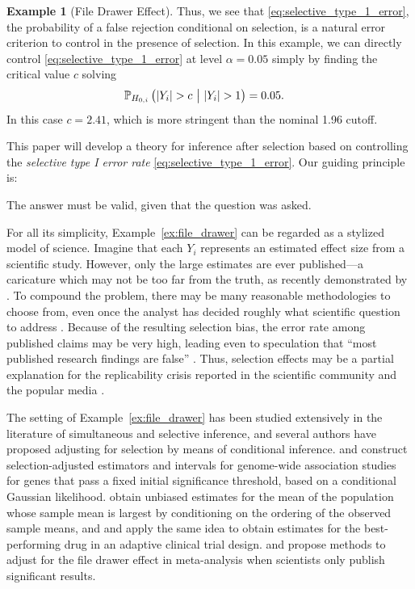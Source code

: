 \documentclass{article}
\theoremstyle{definition}
\newtheorem{example}{Example}
\begin{document}
\begin{example}[File Drawer Effect]
Thus, we see that \eqref{eq:selective_type_1_error}, the probability of a false rejection conditional on selection, is a natural error criterion to control in the presence of selection. In this example, we can directly control \eqref{eq:selective_type_1_error} at level $\alpha=0.05$ simply by finding the critical value $c$ solving
\begin{align*}
\P_{H_{0,i}}\left( |Y_i| > c\ \big|\ |Y_i| > 1 \right) &= 0.05.
\end{align*}
In this case $c = 2.41$, which is more stringent than the nominal 1.96 cutoff.
\end{example}

This paper will develop a theory for inference after selection based on controlling the {\em selective type I error rate} \eqref{eq:selective_type_1_error}. Our guiding principle is:
\begin{center}
The answer must be valid, given that the question was asked.
\end{center}

For all its simplicity, Example~\ref{ex:file_drawer} can be regarded as a stylized model of science. Imagine that each $Y_i$ represents an estimated effect size from a scientific study. However, only the large estimates are ever published---a caricature which may not be too far from the truth, as recently demonstrated by \citet{franco14}. To compound the problem, there may be many reasonable methodologies to choose from, even once the analyst has decided roughly what scientific question to address \citep{gelman2013garden}. Because of the resulting selection bias, the error rate among published claims may be very high, leading even to speculation that ``most published research findings are false'' \citep{ioannidis2005most}. Thus, selection effects may be a partial explanation for the replicability crisis reported in the scientific community \citep{yong2012replication} and the popular media \citep{johnson2014new}.

The setting of Example~\ref{ex:file_drawer} has been studied extensively in the literature of simultaneous and selective inference, and several authors have proposed adjusting for selection by means of conditional inference. \citet{zollner2007overcoming} and \citet{zhong2008bias} construct selection-adjusted estimators and intervals for genome-wide association studies for genes that pass a fixed initial significance threshold, based on a conditional Gaussian likelihood.  \citet{cohen1989two} obtain unbiased estimates for the mean of the population whose sample mean is largest by conditioning on the ordering of the observed sample means, and \citet{sampson2005drop} and \citet{sill2009drop} apply the same idea to obtain estimates for the best-performing drug in an adaptive clinical trial design. \citet{hedges1984estimation} and \citet{hedges1992modeling} propose methods to adjust for the file drawer effect in meta-analysis when scientists only publish significant results.
\end{document}
